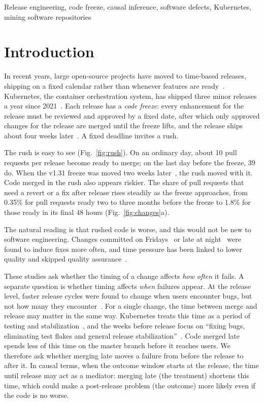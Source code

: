 \documentclass[10pt,conference]{IEEEtran}
\begin{document}
\begin{IEEEkeywords}
Release engineering, code freeze, causal inference, software defects, Kubernetes, mining software repositories
\end{IEEEkeywords}

\section{Introduction}

In recent years, large open-source projects have moved to time-based releases, shipping on a fixed calendar rather than whenever features are ready~\cite{michlmayr2015timebased}. Kubernetes, the container orchestration system, has shipped three minor releases a year since 2021~\cite{kep2572}. Each release has a \emph{code freeze}: every enhancement for the release must be reviewed and approved by a fixed date, after which only approved changes for the release are merged until the freeze lifts, and the release ships about four weeks later~\cite{k8sphases,k8scycle}. A fixed deadline invites a rush.

The rush is easy to see (Fig.~\ref{fig:rush}). On an ordinary day, about 10 pull requests per release become ready to merge; on the last day before the freeze, 39 do. When the v1.31 freeze was moved two weeks later~\cite{k8s131freeze}, the rush moved with it. Code merged in the rush also appears riskier. The share of pull requests that need a revert or a fix after release rises steadily as the freeze approaches, from 0.35\% for pull requests ready two to three months before the freeze to 1.8\% for those ready in its final 48 hours (Fig.~\ref{fig:changes}a).

The natural reading is that rushed code is worse, and this would not be new to software engineering. Changes committed on Fridays~\cite{sliwerski2005fridays} or late at night~\cite{eyolfson2011time} were found to induce fixes more often, and time pressure has been linked to lower quality and skipped quality assurance~\cite{kuutila2020time}.

These studies ask whether the timing of a change affects \emph{how often} it fails. A separate question is whether timing affects \emph{when} failures appear. At the release level, faster release cycles were found to change when users encounter bugs, but not how many they encounter~\cite{khomh2012faster}. For a single change, the time between merge and release may matter in the same way. Kubernetes treats this time as a period of testing and stabilization~\cite{k8scycle}, and the weeks before release focus on ``fixing bugs, eliminating test flakes and general release stabilization''~\cite{k8sphases}. Code merged late spends less of this time on the master branch before it reaches users. We therefore ask whether merging late moves a failure from before the release to after it. In causal terms, when the outcome window starts at the release, the time until release may act as a mediator: merging late (the treatment) shortens this time, which could make a post-release problem (the outcome) more likely even if the code is no worse.
\end{document}
